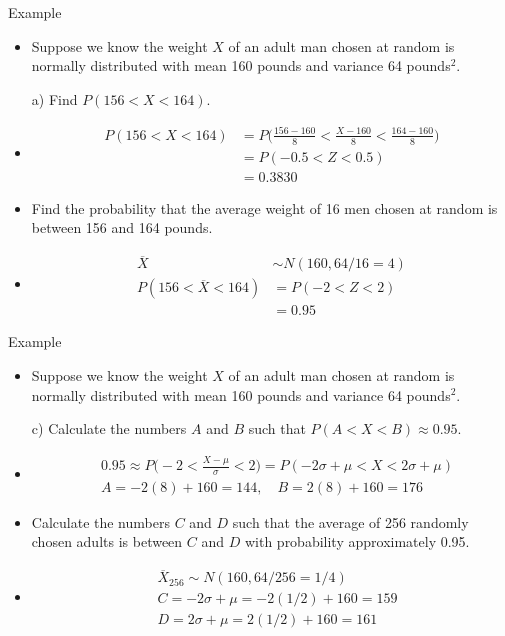 \documentclass[10pt, handout, xcolor=table]{beamer}
\begin{document}
\begin{frame}{Example}
\begin{itemize}
\item Suppose we know the weight $X$ of an adult man chosen at random is normally distributed with mean 160 pounds and variance 64 pounds$^2$. \\[10pt]
\item[a)] Find $P(156 < X < 164)$.
\item<2->[] {\color{red} 
\vspace*{-0.25cm}
\begin{align*}
P(156 < X < 164) &= P\bigg(\frac{156-160}{8} < \frac{X - 160}{8} < \frac{164-160}{8}\bigg) \\
&= P(-0.5 < Z < 0.5) \\
&=  0.3830
\end{align*}}
\vspace*{-0.25cm}
\item<3->[b)] Find the probability that the average weight of 16 men chosen at random is between 156 and 164 pounds.
\vspace*{-0.25cm}
\item<4->[] \color{red}
\begin{align*}
\overline{X} &\sim N(160, 64/16 = 4) \\
P(156 < \overline{X} < 164) &= P(-2 < Z < 2)\\
&= 0.95
\end{align*}
\end{itemize}
\end{frame}

\begin{frame}{Example}
\begin{itemize}
\item Suppose we know the weight $X$ of an adult man chosen at random is normally distributed with mean 160 pounds and variance 64 pounds$^2$. \\[10pt]
\item[c)] Calculate the numbers $A$ and $B$ such that $P(A < X < B) \approx 0.95$.
\item<2->[] {\color{red} 
\vspace*{-0.25cm}
\begin{align*}
&0.95 \approx P\bigg(-2 < \frac{X-\mu}{\sigma} < 2\bigg) = P(-2\sigma + \mu < X < 2\sigma + \mu) \\
&A = -2(8) + 160 = 144,  \quad B = 2(8) + 160 = 176
\end{align*}}
\vspace*{-0.25cm}
\item<3->[d)] Calculate the numbers $C$ and $D$ such that the average of 256 randomly chosen adults is between $C$ and $D$ with probability approximately 0.95.
\item<4->[] {\color{red}
\vspace*{-0.5cm}
\begin{align*}
&\overline{X}_{256} \sim N(160, 64/256 = 1/4) \\
&C = -2\sigma + \mu = -2(1/2) + 160 = 159 \\
&D = 2\sigma + \mu = 2(1/2) + 160 = 161
\end{align*}}
\vspace*{-0.25cm}
\end{itemize}
\end{frame}
\end{document}
